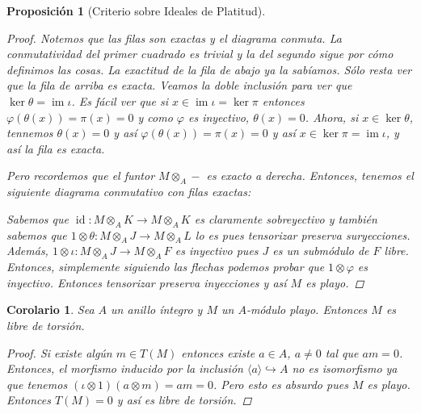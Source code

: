 \documentclass[12pt]{book}
\newtheorem{prop}[teo]{Proposición}
\newtheorem{cor}[teo]{Corolario}
\theoremstyle{definition}
\DeclareMathOperator{\id}{id}
\DeclareMathOperator{\im}{im}
\begin{document}
\begin{prop}[Criterio sobre Ideales de Platitud]
\begin{proof}
Notemos que las filas son exactas y el diagrama conmuta. La conmutatividad del primer cuadrado es trivial y la del segundo sigue por cómo definimos las cosas. La exactitud de la fila de abajo ya la sabíamos. Sólo resta ver que la fila de arriba es exacta. Veamos la doble inclusión para ver que $\ker \theta = \im \iota$. Es fácil ver que si $x\in \im\iota = \ker \pi$ entonces  $\varphi(\theta(x)) = \pi(x) = 0$ y como $\varphi$ es inyectivo, $\theta(x)=0$. Ahora, si $x\in\ker\theta$, tennemos $\theta(x)=0$ y así $\varphi(\theta(x))=\pi(x) = 0$ y así $x\in\ker\pi = \im \iota$, y así la fila es exacta.

Pero recordemos que el funtor $M\otimes_A -$ es exacto a derecha. Entonces, tenemos el siguiente diagrama conmutativo con filas exactas:

\begin{center}\end{center}

Sabemos que $\id:M\otimes_A K\to M\otimes_A K$ es claramente sobreyectivo y también sabemos que $1\otimes\theta:M\otimes_A J\to M\otimes_A L$ lo es pues tensorizar preserva suryecciones. Además, $1\otimes \iota: M\otimes_A J\to M\otimes_A F$ es inyectivo pues $J$ es un submódulo de $F$ libre. Entonces, simplemente siguiendo las flechas podemos probar que $1\otimes\varphi$ es inyectivo. Entonces tensorizar preserva inyecciones y así $M$ es playo.

\end{proof}
\end{prop}

\begin{cor}
Sea $A$ un anillo íntegro y $M$ un $A$-módulo playo. Entonces $M$ es libre de torsión.
\begin{proof}
Si existe algún $m\in T(M)$ entonces existe $a\in A$, $a\neq 0$ tal que $am=0$. Entonces, el morfismo inducido por la inclusión $\langle a\rangle\hookrightarrow A$ no es isomorfismo ya que tenemos $(\iota\otimes 1)(a\otimes m) = am = 0$. Pero esto es absurdo pues $M$ es playo. Entonces $T(M)=0$ y así es libre de torsión.
\end{proof}
\end{cor}
\end{document}
